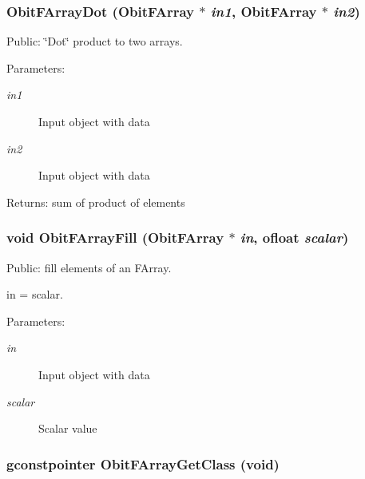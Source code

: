 \subsubsection{ Obit\-FArray\-Dot ({\bf Obit\-FArray} $\ast$ {\em in1}, {\bf Obit\-FArray} $\ast$ {\em in2})}\label{ObitFArray_8c_a57}


Public: \char`\"{}Dot\char`\"{} product to two arrays. 

\begin{Desc}
\item[Parameters:]
\begin{description}
\item[{\em in1}]Input object with data \item[{\em in2}]Input object with data \end{description}
\end{Desc}
\begin{Desc}
\item[Returns:]sum of product of elements \end{Desc}
\subsubsection{\setlength{\rightskip}{0pt plus 5cm}void Obit\-FArray\-Fill ({\bf Obit\-FArray} $\ast$ {\em in}, {\bf ofloat} {\em scalar})}\label{ObitFArray_8c_a35}


Public: fill elements of an FArray. 

in = scalar. \begin{Desc}
\item[Parameters:]
\begin{description}
\item[{\em in}]Input object with data \item[{\em scalar}]Scalar value \end{description}
\end{Desc}
\subsubsection{\setlength{\rightskip}{0pt plus 5cm}gconstpointer Obit\-FArray\-Get\-Class (void)}\label{ObitFArray_8c_a15}


